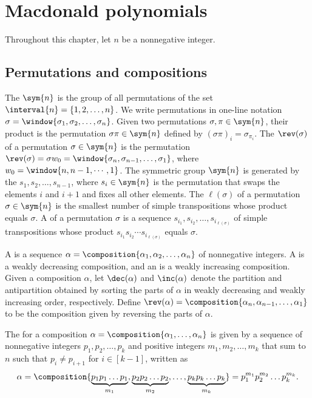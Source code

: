\chapter{Macdonald polynomials}

Throughout this chapter, let \(n\) be a nonnegative integer.

\section{Permutations and compositions}

The  \(\sym{n}\) is
the group of all permutations of the set
\(\interval{n} = \{1, 2, \ldots, n\}\).
We write permutations in one-line notation
\(\sigma = \window{\sigma_1, \sigma_2, \ldots, \sigma_n}\).
Given two permutations \(\sigma, \pi \in \sym{n}\),
their product is the permutation \(\sigma \pi \in \sym{n}\)
defined by \((\sigma \pi)_i = \sigma_{\pi_i}\).
The  \(\rev(\sigma)\) of
a permutation \(\sigma \in \sym{n}\) is the permutation
\(\rev(\sigma) = \sigma w_0 = \window{\sigma_n, \sigma_{n-1}, \dots, \sigma_1}\),
where \(w_0 = \window{n, n-1, \cdots, 1}\).
The symmetric group \(\sym{n}\) is generated by
the  \(s_1, s_2, \ldots, s_{n-1}\),
where \(s_i \in \sym{n}\) is the permutation that swaps the elements \(i\) and \(i+1\) and fixes all other elements.
The  \(\ell(\sigma)\) of a permutation \(\sigma \in \sym{n}\) is
the smallest number of simple transpositions whose product equals \(\sigma\).
A  of a permutation \(\sigma\) is
a sequence \(s_{i_1},s_{i_2},\ldots,s_{i_{\ell(\sigma)}}\) of simple transpositions
whose product \(s_{i_1}s_{i_2}\cdots s_{i_{\ell(\sigma)}}\) equals \(\sigma\).

A  is a sequence
\(\alpha = \composition{\alpha_1, \alpha_2, \ldots, \alpha_n}\)
of nonnegative integers.
A  is a weakly decreasing composition,
and an  is a weakly increasing composition.
Given a composition \(\alpha\), let \(\dec(\alpha)\) and \(\inc(\alpha)\) denote
the partition and antipartition obtained by sorting the parts of \(\alpha\)
in weakly decreasing and weakly increasing order, respectively.
Define \(\rev(\alpha)=\composition{\alpha_n, \alpha_{n-1}, \ldots, \alpha_1}\)
to be the composition given by reversing the parts of \(\alpha\).

The  for a composition \(\alpha = \composition{\alpha_1, \ldots, \alpha_n}\)
is given by a sequence of nonnegative integers \(p_1, p_2, \ldots, p_k\)
and positive integers \(m_1, m_2, \ldots, m_k\) that sum to \(n\)
such that \(p_i \neq p_{i+1}\) for \(i\in[k-1]\), written as
\begin{equation*}
	\alpha = \composition{
		\underbrace{p_1 p_1 \ldots p_1}_{m_1},
		\underbrace{p_2 p_2 \ldots p_2}_{m_2},
		\ldots,
		\underbrace{p_k p_k \ldots p_k}_{m_k}
	} = p_1^{m_1} p_2^{m_2} \ldots p_k^{m_k}.
\end{equation*}

